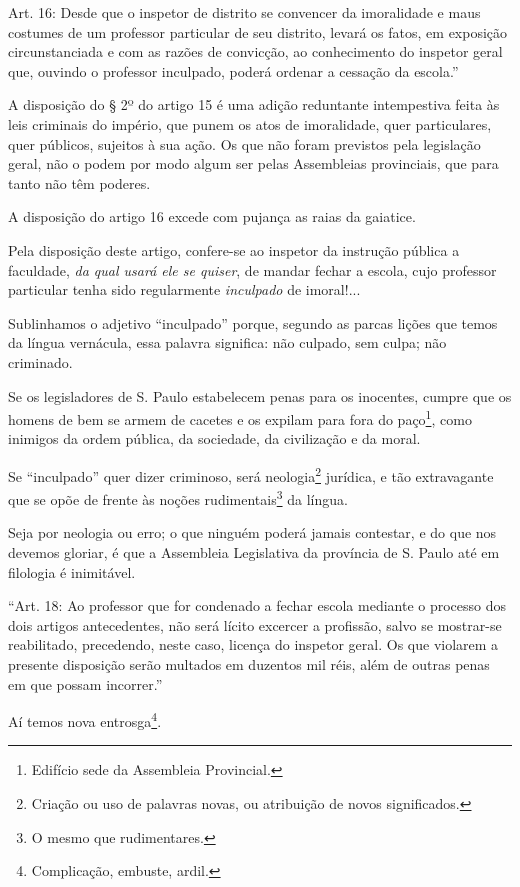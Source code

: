Art. 16: Desde que o inspetor de distrito se convencer da imoralidade e
maus costumes de um professor particular de seu distrito, levará os
fatos, em exposição circunstanciada e com as razões de convicção, ao
conhecimento do inspetor geral que, ouvindo o professor inculpado,
poderá ordenar a cessação da escola.''

A disposição do § 2º do artigo 15 é uma adição reduntante intempestiva
feita às leis criminais do império, que punem os atos de imoralidade,
quer particulares, quer públicos, sujeitos à sua ação. Os que não foram
previstos pela legislação geral, não o podem por modo algum ser pelas
Assembleias provinciais, que para tanto não têm poderes.

A disposição do artigo 16 excede com pujança as raias da gaiatice.

Pela disposição deste artigo, confere-se ao inspetor da instrução
pública a faculdade, \emph{da qual usará ele se quiser}, de mandar
fechar a escola, cujo professor particular tenha sido regularmente
\emph{inculpado} de imoral!...

Sublinhamos o adjetivo ``inculpado'' porque, segundo as parcas lições que
temos da língua vernácula, essa palavra significa: não culpado, sem
culpa; não criminado.

Se os legisladores de S. Paulo estabelecem penas para os inocentes,
cumpre que os homens de bem se armem de cacetes e os expilam para fora
do paço\footnote{Edifício sede da Assembleia Provincial.}, como
inimigos da ordem pública, da sociedade, da civilização e da moral.

Se ``inculpado'' quer dizer criminoso, será neologia\footnote{Criação ou
  uso de palavras novas, ou atribuição de novos significados.} jurídica,
e tão extravagante que se opõe de frente às noções
rudimentais\footnote{O mesmo que rudimentares.} da língua.

Seja por neologia ou erro; o que ninguém poderá jamais contestar, e do
que nos devemos gloriar, é que a Assembleia Legislativa da província de
S. Paulo até em filologia é inimitável.

``Art. 18: Ao professor que for condenado a fechar escola mediante o
processo dos dois artigos antecedentes, não será lícito excercer a
profissão, salvo se mostrar-se reabilitado, precedendo, neste caso,
licença do inspetor geral. Os que violarem a presente disposição serão
multados em duzentos mil réis, além de outras penas em que possam
incorrer.''

Aí temos nova entrosga\footnote{Complicação, embuste, ardil.}.

